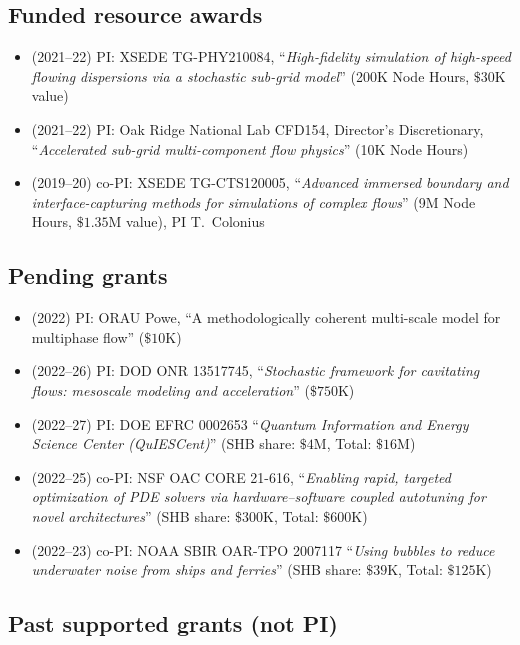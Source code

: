 \subsection{Funded resource awards}

\begin{itemize}
    \item (2021--22) PI: XSEDE TG-PHY210084, ``\textit{High-fidelity simulation of high-speed flowing dispersions via a stochastic sub-grid model}''  (200K Node Hours, $\$30$K value)
    \item (2021--22) PI: Oak Ridge National Lab CFD154, Director's Discretionary, ``\textit{Accelerated sub-grid multi-component flow physics}'' (10K Node Hours)
    \item (2019--20) co-PI: XSEDE TG-CTS120005, ``\textit{Advanced immersed boundary and interface-capturing methods for simulations of complex flows}'' (9M Node Hours, $\$1.35$M value), PI T.\ Colonius
\end{itemize}

\subsection{Pending grants}

\begin{itemize}
    \item (2022) PI: ORAU Powe, ``A methodologically coherent multi-scale model for multiphase flow'' ($\$10$K)
    \item (2022--26) PI: DOD ONR 13517745, ``\textit{Stochastic framework for cavitating flows: mesoscale modeling and acceleration}'' ($\$750$K)
    \item (2022--27) PI: DOE EFRC 0002653 ``\textit{Quantum Information and Energy Science Center (QuIESCent)}'' (SHB share: $\$4$M, Total: $\$16$M)
    \item (2022--25) co-PI: NSF OAC CORE 21-616, ``\textit{Enabling rapid, targeted optimization of PDE solvers via hardware--software coupled autotuning for novel architectures}'' (SHB share: $\$300$K, Total: $\$600$K)
    \item (2022--23) co-PI: NOAA SBIR OAR-TPO 2007117 ``\textit{Using bubbles to reduce underwater noise from ships and ferries}'' (SHB share: $\$39$K, Total: $\$125$K)
\end{itemize}

\subsection{Past supported grants (not PI)}

